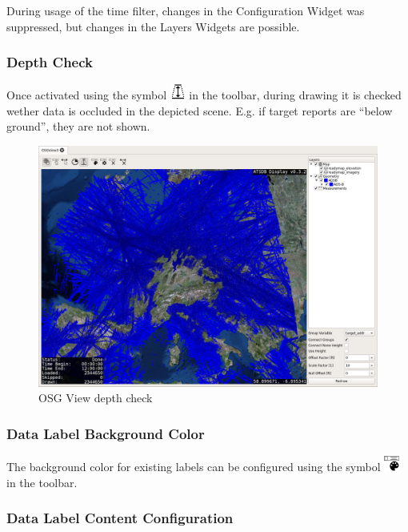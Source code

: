 {During usage of the time filter, changes in the Configuration Widget was suppressed, but changes in the Layers Widgets are possible.

\subsubsection{Depth Check}

Once activated using the symbol \includegraphics[width=0.5cm]{../../data/icons/depth.png} in the toolbar, during drawing it is checked wether data is occluded in the depicted scene. E.g. if target reports are ``below ground'', they are not shown.

\begin{figure}[H]
    \hspace*{-2cm}
    \includegraphics[width=18cm,frame]{../screenshots/osgview_depth_check.png}
  \caption{OSG View depth check}
\end{figure}

\subsubsection{Data Label Background Color}

The background color for existing labels can be configured using the symbol \includegraphics[width=0.5cm]{../../data/icons/label_color.png} in the toolbar.

\subsubsection{Data Label Content Configuration}

}
